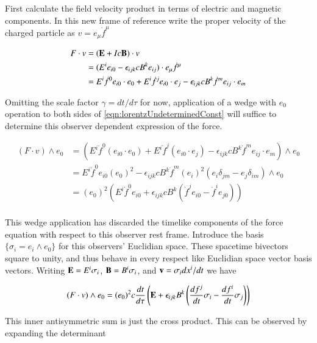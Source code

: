 \documentclass{article}
\newcommand{\fdot}[0]{\dot{f}}
\begin{document}
First calculate the field velocity product in terms of electric and magnetic components.  In this new frame of reference write the proper velocity of the charged particle as
$v = e_\mu \fdot^\mu$

\begin{align*}
F \cdot v
&= (\BE + I c \BB) \cdot v \\
&= (E^i e_{i0} - \epsilon_{ijk}c B^k e_{ij}) \cdot e_\mu \fdot^\mu \\
&= 
  E^i \fdot^0 e_{i0} \cdot e_0
+ E^i \fdot^j e_{i0} \cdot e_j
- \epsilon_{ijk} c B^k \fdot^m e_{ij} \cdot e_m \\
\end{align*}

Omitting the scale factor $\gamma = dt/d\tau$ for now, application of a wedge with $e_0$ operation to both sides 
of 
\ref{eqn:lorentzUndeterminedConst}
will suffice to determine this observer dependent expression of the force.

\begin{align*}
(F \cdot v) \wedge e_0
&= 
\left(
  E^i \fdot^0 (e_{i0} \cdot e_0)
+ E^i \fdot^j (e_{i0} \cdot e_j)
- \epsilon_{ijk} c B^k \fdot^m e_{ij} \cdot e_m \right) \wedge e_0 \\
&= E^i \fdot^0 e_{i0} (e_0)^2 - \epsilon_{ijk} c B^k \fdot^m (e_i)^2 ( e_{i} \delta_{jm} -e_{j} \delta_{im} ) \wedge e_0 \\
&= (e_0)^2 \left( E^i \fdot^0 e_{i0} + \epsilon_{ijk} c B^k \left( \fdot^j e_{i0} - \fdot^i e_{j0} \right) \right) \\
\end{align*}

This wedge application has discarded the timelike components of the force equation with respect to this observer rest frame.
Introduce the basis
$\{\sigma_i = e_i \wedge e_0\}$ for this observers' Euclidian space.  These spacetime bivectors square to unity, and thus behave in every respect like
Euclidian space vector basis vectors.  Writing $\mathbf{E} = E^i \sigma_i$, $\mathbf{B} = B^i \sigma_i$, and $\mathbf{v} = \sigma_i dx^i/dt$ we have

\begin{align*}
(F \cdot v) \wedge e_0
&= (e_0)^2 c \frac{dt}{d\tau} \left( \mathbf{E} + \epsilon_{ijk} B^k \left( \frac{df^j}{dt} \sigma_{i} - \frac{df^i}{dt} \sigma_{j} \right) \right) \\
\end{align*}

This inner antisymmetric sum is just the cross product.  This can be observed by expanding the determinant
\end{document}
